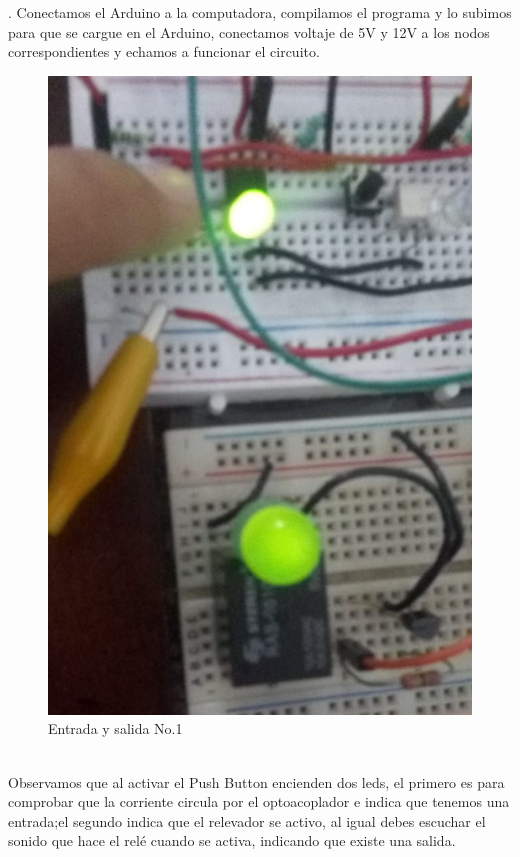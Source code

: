 \documentclass[12pt,a4paper]{article}
\begin{document}
. Conectamos el Arduino a la computadora, compilamos el programa y lo subimos para que se cargue en el Arduino, conectamos voltaje de 5V y 12V a los nodos correspondientes y echamos a funcionar el circuito.
\begin{figure}[hbtp]
\centering
\includegraphics[scale=0.3]{Circuito/1.jpeg}
\caption{Entrada y salida No.1}
\end{figure}\\
Observamos que al activar el Push Button encienden dos leds, el primero es para comprobar que la corriente circula por el optoacoplador e indica que tenemos una entrada;el segundo indica que el relevador se activo, al igual debes escuchar el sonido que hace el relé cuando se activa, indicando que existe una salida.\\
\end{document}
